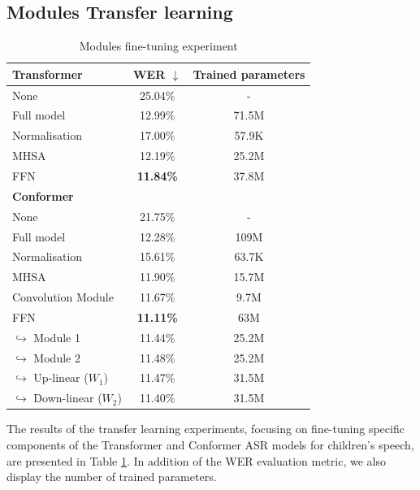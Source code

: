 \subsection{Modules Transfer learning}
\begin{table}
    \begin{center}
        \begin{tabular}{lcc}\hline
            \textbf{Transformer}    & WER  $\downarrow$   & Trained parameters \\ \hline
            None & 25.04\% & -   \\
            Full model   & 12.99\% & 71.5M   \\ \hline
            Normalisation & 17.00\% & 57.9K  \\
            MHSA & 12.19\% & 25.2M  \\
            FFN    & \textbf{11.84\%}     &  37.8M \\ \hline \hline
            \textbf{Conformer}    &     & \\ \hline
            None & 21.75\% & -   \\
            Full model   & 12.28\% & 109M   \\ \hline
            Normalisation & 15.61\% & 63.7K  \\
            MHSA & 11.90\% & 15.7M  \\
            Convolution Module & 11.67\% & 9.7M \\
            FFN    & \textbf{11.11\%}     &  63M \\
            \quad $\hookrightarrow$ Module 1    & 11.44\%     &  25.2M \\
            \quad $\hookrightarrow$ Module 2    & 11.48\%     &  25.2M \\
            \quad $\hookrightarrow$ Up-linear ($W_1$)    & 11.47\%     &  31.5M \\
            \quad $\hookrightarrow$ Down-linear ($W_2$)    & 11.40\%     &  31.5M \\ \hline
        \end{tabular}
    \end{center}
    \caption{Modules fine-tuning experiment}
    \label{table:ModulesTL}
\end{table}
The results  of the transfer learning experiments, focusing on fine-tuning specific components of the Transformer and Conformer ASR models for children's speech, are presented in Table \ref{table:ModulesTL}. In addition of the WER evaluation metric, we also display the number of trained parameters. 

